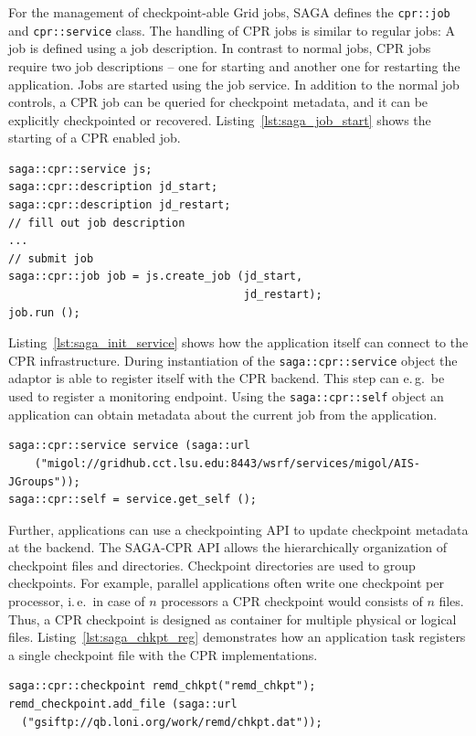 \documentclass[times, 10pt, twocolumn]{article}
\begin{document}
For the management of checkpoint-able Grid jobs, SAGA defines the \texttt{cpr::job} and \texttt{cpr::service} class. The handling of 
CPR jobs is similar to regular jobs: A job is defined using a job description. In contrast to normal jobs, 
CPR jobs require  two job descriptions -- one for starting and another one for restarting the application.
Jobs are started using the job service. In addition to the normal job controls, a CPR job can be queried for checkpoint metadata, and 
it can be explicitly checkpointed or recovered. Listing~\ref{lst:saga_job_start} shows the starting of a CPR enabled job.


\begin{lstlisting}[style=myListing, caption={\small \bf SAGA-CPR: Starting a Job}, float=t, label={lst:saga_job_start}]
saga::cpr::service js; 
saga::cpr::description jd_start;
saga::cpr::description jd_restart;
// fill out job description
...
// submit job  
saga::cpr::job job = js.create_job (jd_start, 
                                    jd_restart);
job.run ();
\end{lstlisting}

Listing~\ref{lst:saga_init_service} shows how the application itself can connect to the CPR infrastructure. During instantiation of the \texttt{saga::cpr::service} object the adaptor is able to register itself with the CPR backend. This step can e.\,g.\ be used to register a monitoring endpoint. Using the \texttt{saga::cpr::self} object an application can obtain metadata about the current job from the application.                                                                               
\begin{lstlisting}[style=myListing, caption={\small \bf SAGA-CPR: Initialize Migol Session}, float=t, label={lst:saga_init_service}]
saga::cpr::service service (saga::url 
    ("migol://gridhub.cct.lsu.edu:8443/wsrf/services/migol/AIS-JGroups"));
saga::cpr::self = service.get_self ();
\end{lstlisting}

Further, applications can use a checkpointing API to update checkpoint metadata at the backend. The SAGA-CPR API allows the hierarchically 
organization of checkpoint files and directories. Checkpoint directories are 
used to group checkpoints. For example, parallel applications often write one checkpoint per 
processor, i.\,e.\ in case of $n$ processors a CPR checkpoint
would consists of $n$ files. Thus, a CPR checkpoint is designed as container 
for multiple physical or logical files. Listing~\ref{lst:saga_chkpt_reg} demonstrates 
how an application task registers a single checkpoint file with the CPR implementations.     
\begin{lstlisting}[style=myListing, caption={\small \bf SAGA-CPR: Register Checkpoint with Migol}, float=t, label={lst:saga_chkpt_reg}]
saga::cpr::checkpoint remd_chkpt("remd_chkpt");
remd_checkpoint.add_file (saga::url 
  ("gsiftp://qb.loni.org/work/remd/chkpt.dat"));
\end{lstlisting}
\end{document}
